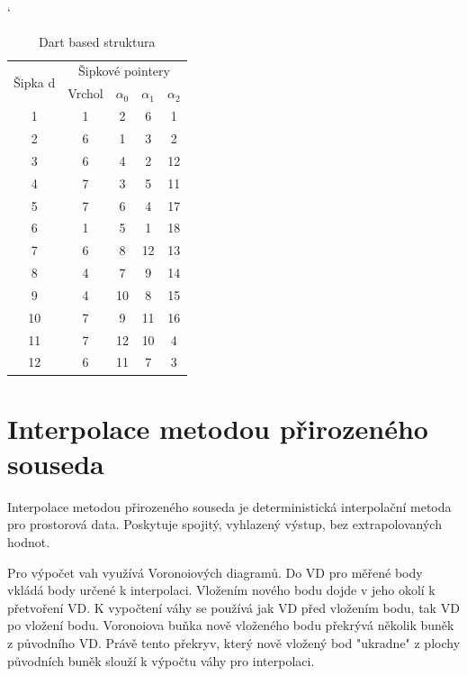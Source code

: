 \documentclass[12pt,a4paper]{article}
\begin{document}
\begin{table}[h]
\catcode`
\begin{tabular}{|c||c|c|c|c|}
\hline
\multirow{2}{*}{Šipka d} & \multicolumn{4}{c|}{Šipkové pointery} \\ \cline{2-5} 
                         & Vrchol &$\alpha_0$ & $\alpha_1$ & $\alpha_2$      \\ \hline
1                        & 1          & 2      & 6      & 1      \\ \hline
2                        & 6          & 1      & 3      & 2      \\ \hline
3                        & 6          & 4      & 2      & 12     \\ \hline
4                        & 7          & 3      & 5      & 11     \\ \hline
5                        & 7          & 6      & 4      & 17     \\ \hline
6                        & 1          & 5      & 1      & 18     \\ \hline
7                        & 6          & 8      & 12     & 13     \\ \hline
8                        & 4          & 7      & 9      & 14     \\ \hline
9                        & 4          & 10     & 8      & 15     \\ \hline
10                       & 7          & 9      & 11     & 16     \\ \hline
11                       & 7          & 12     & 10     & 4      \\ \hline
12                       & 6          & 11     & 7      & 3      \\ \hline
\end{tabular}
\caption{Dart based struktura}
\label{tab:dart_based}
\end{table}

\newpage
\section{Interpolace metodou přirozeného souseda}

Interpolace metodou přirozeného souseda je deterministická interpolační metoda pro prostorová data. Poskytuje spojitý, vyhlazený výstup, bez extrapolovaných hodnot. 

Pro výpočet vah využívá Voronoiových diagramů. Do VD pro měřené body vkládá body určené k interpolaci. Vložením nového bodu dojde v jeho okolí k přetvoření VD. K vypočtení váhy se používá jak VD před vložením bodu, tak VD po vložení bodu. Voronoiova buňka nově vloženého bodu překrývá několik buněk z původního VD. Právě tento překryv, který nově vložený bod "ukradne" z plochy původních buněk slouží k výpočtu váhy pro interpolaci.
\end{document}
